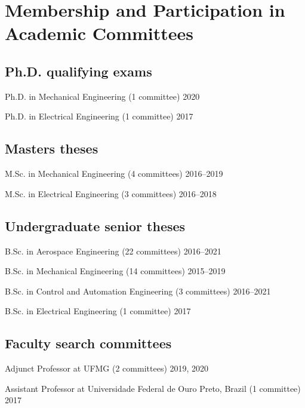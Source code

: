 \documentclass[letterpaper, 11pt, oneside]{memoir}
\begin{document}
\section{Membership and Participation in Academic Committees}
\subsection{Ph.D. qualifying exams}
\begin{description}
\item {Ph.D. in Mechanical Engineering (1 committee)} \hfill {2020}
\item {Ph.D. in Electrical Engineering (1 committee)} \hfill {2017}
\end{description}

\subsection{Masters theses}
\begin{description} 
\item {M.Sc. in Mechanical Engineering (4 committees)} \hfill {2016--2019}
\item {M.Sc. in Electrical Engineering (3 committees)} \hfill {2016--2018}
\end{description}

\subsection{Undergraduate senior theses}
\begin{description} 
\item {B.Sc. in Aerospace Engineering (22 committees)} \hfill {2016--2021}
\item {B.Sc. in Mechanical Engineering (14 committees)} \hfill {2015--2019}
\item {B.Sc. in Control and Automation Engineering (3 committees)} \hfill {2016--2021}
\item {B.Sc. in Electrical Engineering (1 committee)} \hfill {2017}
\end{description}
\subsection{Faculty search committees} 
\begin{description}
\item {Adjunct Professor at UFMG (2 committees)} \hfill {2019, 2020}
\item {%
  Assistant Professor at Universidade Federal de Ouro Preto, Brazil
  (1 committee)
}  \hfill {2017}
\end{description}
\end{document}
